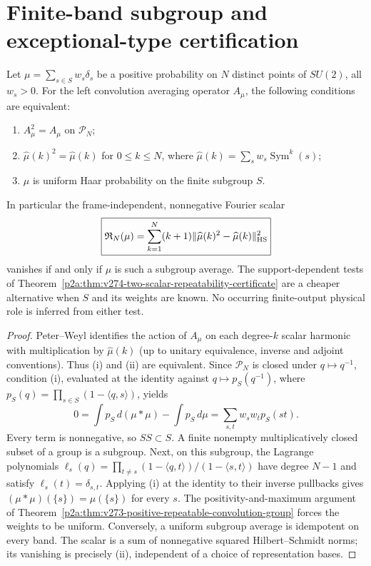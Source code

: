 \documentclass[12pt,a4paper]{article}
\begin{document}
\section{Finite-band subgroup and exceptional-type certification}
\label{p2a:sec:clean-finite-certificates}
\begin{theorem}
\label{p2a:thm:v275-repeatability-PN-suffices}
Let $\mu=\sum_{s\in S}w_s\delta_s$ be a positive probability
on $N$ distinct points of $SU(2)$, all $w_s>0$.
For the left convolution averaging operator $A_\mu$, the following
conditions are equivalent:
\begin{enumerate}[label=(\roman*),leftmargin=2em]
\item $A_\mu^2=A_\mu$ on $\mathcal P_N$;
\item $\widehat\mu(k)^2=\widehat\mu(k)$ for $0\le k\le N$,
where $\widehat\mu(k)=\sum_sw_s\operatorname{Sym}^k(s)$;
\item $\mu$ is uniform Haar probability on the finite subgroup $S$.
\end{enumerate}
In particular the frame-independent, nonnegative Fourier scalar
\[
 \boxed{\mathfrak R_N(\mu)=
 \sum_{k=1}^{N}(k+1)
 \|\widehat\mu(k)^2-\widehat\mu(k)\|_{\rm HS}^2}
\]
vanishes if and only if $\mu$ is such a subgroup average.
The support-dependent tests of
Theorem~\ref{p2a:thm:v274-two-scalar-repeatability-certificate}
are a cheaper alternative when $S$ and its weights are known.
No occurring finite-output physical role is inferred from either test.
\end{theorem}
\begin{proof}
Peter--Weyl identifies the action of $A_\mu$ on each degree-$k$
scalar harmonic with multiplication by $\widehat\mu(k)$ (up to
unitary equivalence, inverse and adjoint conventions). Thus (i)
and (ii) are equivalent. Since $\mathcal P_N$ is closed under
$q\mapsto q^{-1}$, condition (i), evaluated at the identity
against $q\mapsto p_S(q^{-1})$, where
$p_S(q)=\prod_{s\in S}(1-\langle q,s\rangle)$, yields
\[
 0=\int p_S\,d(\mu*\mu)-\int p_S\,d\mu
  =\sum_{s,t}w_sw_t p_S(st).
\]
Every term is nonnegative, so $SS\subset S$. A finite nonempty
multiplicatively closed subset of a group is a subgroup.
Next, on this subgroup, the Lagrange polynomials
$\ell_s(q)=\prod_{t\ne s}(1-\langle q,t\rangle)/(1-\langle s,t\rangle)$
have degree $N-1$ and satisfy $\ell_s(t)=\delta_{s,t}$.
Applying (i) at the identity to their inverse pullbacks gives
$(\mu*\mu)(\{s\})=\mu(\{s\})$ for every $s$.
The positivity-and-maximum argument of
Theorem~\ref{p2a:thm:v273-positive-repeatable-convolution-group}
forces the weights to be uniform. Conversely, a uniform subgroup
average is idempotent on every band. The scalar is a sum of
nonnegative squared Hilbert--Schmidt norms; its vanishing is
precisely (ii), independent of a choice of representation bases.
\end{proof}
\end{document}
